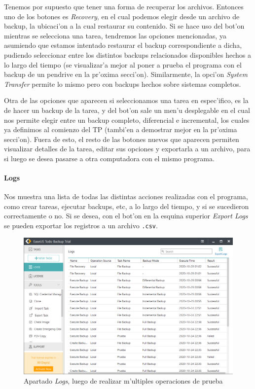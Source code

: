 \documentclass[11pt]{article}
\begin{document}
		Tenemos por supuesto que tener una forma de recuperar los archivos. Entonces uno de los botones es \textit{Recovery}, en el cual podemos elegir desde un archivo de backup, la ubicaci'on a la cual restaurar su contenido. Si se hace uso del bot'on mientras se selecciona una tarea, tendremos las opciones mencionadas, ya asumiendo que estamos intentado restaurar el backup correspondiente a dicha, pudiendo seleccionar entre los distintos backups relacionados disponibles hechos a lo largo del tiempo (se visualizar'a mejor al poner a prueba el programa con el backup de un pendrive en la pr'oxima secci'on). Similarmente, la opci'on \textit{System Transfer} permite lo mismo pero con backups hechos sobre sistemas completos.
		
		Otra de las opciones que aparecen si seleccionamos una tarea en espec'ifico, es la de hacer un backup de la tarea, y del bot'on sale un men'u desplegable en el cual nos permite elegir entre un backup completo, diferencial e incremental, los cuales ya definimos al comienzo del TP (tambi'en a demostrar mejor en la pr'oxima secci'on). Fuera de esto, el resto de las botones nuevos que aparecen permiten visualizar detalles de la tarea, editar sus opciones y exportarla a un archivo, para si luego se desea pasarse a otra computadora con el mismo programa.
		
		
		\paragraph{Logs}
		
		Nos muestra una lista de todas las distintas acciones realizadas con el programa, como crear tareas, ejecutar backups, etc, a lo largo del tiempo, y si se sucedieron correctamente o no. Si se desea, con el bot'on en la esquina superior \textit{Export Logs} se pueden exportar los registros a un archivo \texttt{.csv}.
		
		\begin{figure}[H]
			\centering
			\includegraphics[width=.8\textwidth]{Images/easeus/use_logs}
			\caption{Apartado \textit{Logs}, luego de realizar m'ultiples operaciones de prueba}
		\end{figure} 
		
\end{document}
